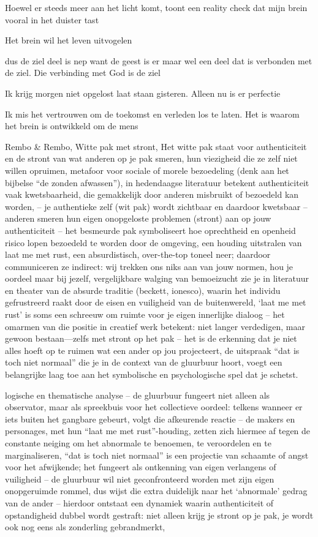 Hoewel er steeds meer aan het licht komt, toont een reality check dat mijn brein vooral in het duister tast

Het brein wil het leven uitvogelen

dus de ziel deel is nep want de geest is er maar wel een deel dat is verbonden met de ziel. Die verbinding met God is de ziel

Ik krijg morgen niet opgelost laat staan gisteren. Alleen nu is er perfectie

Ik mis het vertrouwen om de toekomst en verleden los te laten. Het is waarom het brein is ontwikkeld om de mens

Rembo \& Rembo, Witte pak met stront, Het witte pak staat voor authenticiteit en de stront van wat anderen op je pak smeren, hun viezigheid die ze zelf niet willen opruimen, metafoor voor sociale of morele bezoedeling (denk aan het bijbelse “de zonden afwassen”), in hedendaagse literatuur betekent authenticiteit vaak kwetsbaarheid, die gemakkelijk door anderen misbruikt of bezoedeld kan worden, – je authentieke zelf (wit pak) wordt zichtbaar en daardoor kwetsbaar
– anderen smeren hun eigen onopgeloste problemen (stront) aan op jouw authenticiteit
– het besmeurde pak symboliseert hoe oprechtheid en openheid risico lopen bezoedeld te worden door de omgeving, een houding uitstralen van laat me met rust, een absurdistisch, over-the-top toneel neer; daardoor communiceren ze indirect: wij trekken ons niks aan van jouw normen, hou je oordeel maar bij jezelf, vergelijkbare walging van bemoeizucht zie je in literatuur en theater van de absurde traditie (beckett, ionesco), waarin het individu gefrustreerd raakt door de eisen en vuiligheid van de buitenwereld, ‘laat me met rust’ is soms een schreeuw om ruimte voor je eigen innerlijke dialoog
– het omarmen van die positie in creatief werk betekent: niet langer verdedigen, maar gewoon bestaan—zelfs met stront op het pak
– het is de erkenning dat je niet alles hoeft op te ruimen wat een ander op jou projecteert, de uitspraak “dat is toch niet normaal” die je in de context van de gluurbuur hoort, voegt een belangrijke laag toe aan het symbolische en psychologische spel dat je schetst.

logische en thematische analyse
– de gluurbuur fungeert niet alleen als observator, maar als spreekbuis voor het collectieve oordeel: telkens wanneer er iets buiten het gangbare gebeurt, volgt die afkeurende reactie
– de makers en personages, met hun “laat me met rust”-houding, zetten zich hiermee af tegen de constante neiging om het abnormale te benoemen, te veroordelen en te marginaliseren, “dat is toch niet normaal” is een projectie van schaamte of angst voor het afwijkende; het fungeert als ontkenning van eigen verlangens of vuiligheid
– de gluurbuur wil niet geconfronteerd worden met zijn eigen onopgeruimde rommel, dus wijst die extra duidelijk naar het ‘abnormale’ gedrag van de ander
– hierdoor ontstaat een dynamiek waarin authenticiteit of opstandigheid dubbel wordt gestraft: niet alleen krijg je stront op je pak, je wordt ook nog eens als zonderling gebrandmerkt,

